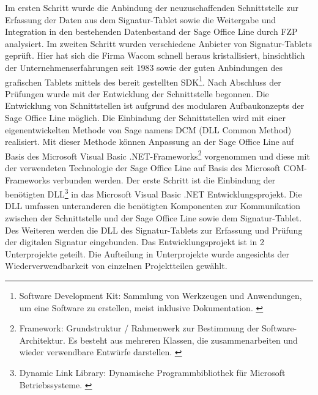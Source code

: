 Im ersten Schritt wurde die Anbindung der neuzuschaffenden Schnittstelle zur Erfassung der Daten aus dem Signatur-Tablet sowie die 
Weitergabe und Integration in den bestehenden Datenbestand der Sage Office Line durch FZP analysiert. Im zweiten Schritt wurden verschiedene
Anbieter von Signatur-Tablets geprüft. Hier hat sich die Firma Wacom schnell heraus kristallisiert, hinsichtlich der Unternehmenserfahrungen seit 1983 \cite{konzept1} sowie der guten Anbindungen des grafischen Tablets mittels des bereit gestellten SDK\footnote{\label{foot:4}Software Development Kit: Sammlung von Werkzeugen und Anwendungen, um eine Software zu erstellen, meist inklusive Dokumentation. \cite{SDK}}. Nach Abschluss der Prüfungen wurde mit der Entwicklung der Schnittstelle begonnen.
\newline
Die Entwicklung von Schnittstellen ist aufgrund des modularen Aufbaukonzepts der Sage Office Line möglich. Die Einbindung der Schnittstellen wird mit einer eigenentwickelten Methode von Sage namens DCM (DLL Common Method) realisiert. Mit dieser Methode können Anpassung an der Sage Office Line auf Basis des Microsoft Visual Basic .NET-Frameworks\footnote{\label{foot:5}Framework: Grundstruktur / Rahmenwerk zur Bestimmung der 
Software-Architektur. Es besteht aus mehreren Klassen, die zusammenarbeiten und wieder verwendbare Entwürfe darstellen. \cite{framework}}
vorgenommen und diese mit der verwendeten Technologie der Sage Office Line auf Basis des Microsoft COM-Frameworks verbunden werden.
\newline
Der erste Schritt ist die Einbindung der benötigten DLL\footnote{\label{foot:6}Dynamic Link Library: Dynamische Programmbibliothek für Microsoft Betriebssysteme. \cite{DLL}} in das Microsoft Visual Basic .NET Entwicklungsprojekt. Die DLL umfassen unteranderen die benötigten Komponenten zur Kommunikation zwischen der Schnittstelle und der Sage Office Line sowie dem Signatur-Tablet. Des Weiteren werden die DLL des Signatur-Tablets zur Erfassung und Prüfung der digitalen Signatur eingebunden. Das Entwicklungsprojekt ist in 2 Unterprojekte geteilt. Die Aufteilung in Unterprojekte wurde angesichts der Wiederverwendbarkeit von einzelnen Projektteilen gewählt.
\newline
